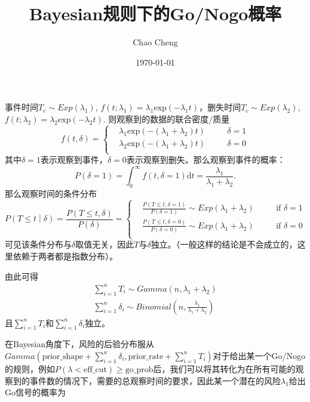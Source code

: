 \documentclass[a4paper,12pt]{article}
\title{Bayesian规则下的Go/Nogo概率}
\author{Chao Cheng}
\date{\today}
\begin{document}
\maketitle

事件时间$T_e\sim Exp(\lambda_1)$, $f(t;\lambda_1) = \lambda_1 \mathrm{exp}\left(-\lambda_1 t\right)$，删失时间$T_c \sim Exp(\lambda_2)$, $f\left(t;\lambda_2\right) = \lambda_2 \mathrm{exp}\left(-\lambda_2t\right)$. 则观察到的数据的联合密度/质量
\[
  f\left(t, \delta\right) = \left\{
    \begin{aligned}
      &\lambda_1\mathrm{exp}\left(-(\lambda_1 + \lambda_2)t\right) && \quad \delta = 1    \\
      &\lambda_2\mathrm{exp}\left(-(\lambda_1 + \lambda_2)t\right) && \quad \delta = 0    \\
    \end{aligned}
  \right.
\]
其中$\delta = 1$表示观察到事件，$\delta = 0$表示观察到删失。那么观察到事件的概率：
\[
  P\left(\delta = 1\right) = \int_0^\infty f\left(t, \delta = 1\right)\mathrm{d}t
  = \frac{\lambda_1}{\lambda_1 + \lambda_2}
  .
\]
那么观察时间的条件分布
\[
  P\left(T \leq t\middle|\delta\right) = \frac{P\left(T\leq t, \delta\right)}{P\left(\delta\right)}
  = \left\{
    \begin{aligned}
          & \frac{P\left(T\leq t, \delta = 1\right)}{P\left(\delta = 1\right)}
    \sim Exp\left(\lambda_1 + \lambda_2\right)
    &&\quad \text{if } \delta = 1    \\
    & \frac{P\left(T\leq t, \delta = 0\right)}{P\left(\delta = 0\right)}
    \sim Exp\left(\lambda_1 + \lambda_2\right)
    &&\quad \text{if } \delta = 0    \\
    \end{aligned}
  \right.
\]
可见该条件分布与$\delta$取值无关，因此$T$与$\delta$独立。（一般这样的结论是不会成立的，这里依赖于两者都是指数分布）。
\par
由此可得
\[
  \begin{aligned}
    \sum\limits_{i = 1}^nT_i \sim Gamma\left(n, \lambda_1 + \lambda_2\right)    \\
    \sum\limits_{i = 1}^n\delta_i \sim Binomial(n, \frac{\lambda_1}{\lambda_1 + \lambda_2})
  \end{aligned}
\]
且$\sum\limits_{i = 1}^nT_i$和$\sum\limits_{i = 1}^n\delta_i$独立。
\par
在Bayesian角度下，风险的后验分布服从$Gamma\left(\text{prior\_shape} + \sum\limits_{i = 1}^n\delta_i, \text{prior\_rate} + \sum\limits_{i = 1}^nT_i\right)$对于给出某一个Go/Nogo的规则，例如$P\left(\lambda < \text{eff\_cut}\right) \geq \text{go\_prob}$后，我们可以将其转化为在所有可能的观察到的事件数的情况下，需要的总观察时间的要求，因此某一个潜在的风险$\lambda_1$给出Go信号的概率为
\end{document}
